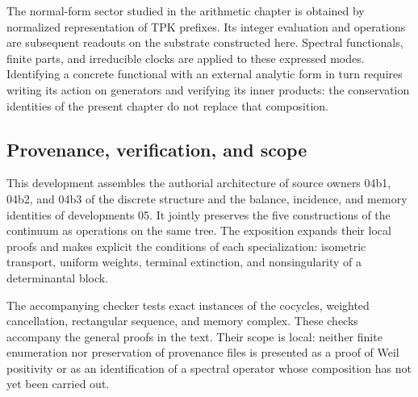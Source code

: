 The normal-form sector studied in the arithmetic chapter is obtained by normalized representation of TPK prefixes. Its integer evaluation and operations are subsequent readouts on the substrate constructed here. Spectral functionals, finite parts, and irreducible clocks are applied to these expressed modes. Identifying a concrete functional with an external analytic form in turn requires writing its action on generators and verifying its inner products: the conservation identities of the present chapter do not replace that composition.

\clearpage
\subsection{Provenance, verification, and scope}
This development assembles the authorial architecture of source owners 04b1, 04b2, and 04b3 of the discrete structure and the balance, incidence, and memory identities of developments 05. It jointly preserves the five constructions of the continuum as operations on the same tree. The exposition expands their local proofs and makes explicit the conditions of each specialization: isometric transport, uniform weights, terminal extinction, and nonsingularity of a determinantal block.

The accompanying checker tests exact instances of the cocycles, weighted cancellation, rectangular sequence, and memory complex. These checks accompany the general proofs in the text. Their scope is local: neither finite enumeration nor preservation of provenance files is presented as a proof of Weil positivity or as an identification of a spectral operator whose composition has not yet been carried out.
